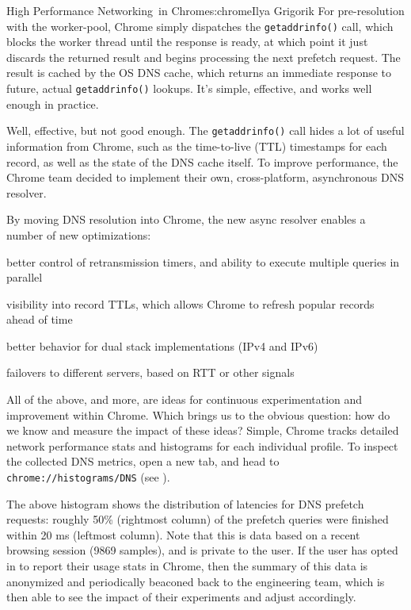 \begin{aosachapter}{High Performance Networking~in Chrome}{s:chrome}{Ilya Grigorik}
For pre-resolution with the worker-pool, Chrome simply dispatches the
\texttt{getaddrinfo()} call, which blocks the worker thread until the
response is ready, at which point it just discards the returned result
and begins processing the next prefetch request. The result is cached by
the OS DNS cache, which returns an immediate response to future, actual
\texttt{getaddrinfo()} lookups. It's simple, effective, and works well
enough in practice.

Well, effective, but not good enough. The \texttt{getaddrinfo()} call
hides a lot of useful information from Chrome, such as the time-to-live
(TTL) timestamps for each record, as well as the state of the DNS cache
itself. To improve performance, the Chrome team decided to implement
their own, cross-platform, asynchronous DNS resolver.


By moving DNS resolution into Chrome, the new async resolver enables a
number of new optimizations:

\begin{aosaitemize}

\item
  better control of retransmission timers, and ability to execute
  multiple queries in parallel
\item
  visibility into record TTLs, which allows Chrome to refresh popular
  records ahead of time
\item
  better behavior for dual stack implementations (IPv4 and IPv6)
\item
  failovers to different servers, based on RTT or other signals
\end{aosaitemize}

All of the above, and more, are ideas for continuous experimentation and
improvement within Chrome. Which brings us to the obvious question: how
do we know and measure the impact of these ideas? Simple, Chrome tracks
detailed network performance stats and histograms for each individual
profile. To inspect the collected DNS metrics, open a new tab, and head
to \texttt{chrome://histograms/DNS} (see
).


The above histogram shows the distribution of latencies for DNS prefetch
requests: roughly 50\% (rightmost column) of the prefetch queries were
finished within 20 ms (leftmost column). Note that this is data based on
a recent browsing session (9869 samples), and is private to the user. If
the user has opted in to report their usage stats in Chrome, then the
summary of this data is anonymized and periodically beaconed back to the
engineering team, which is then able to see the impact of their
experiments and adjust accordingly.


\end{aosachapter}
